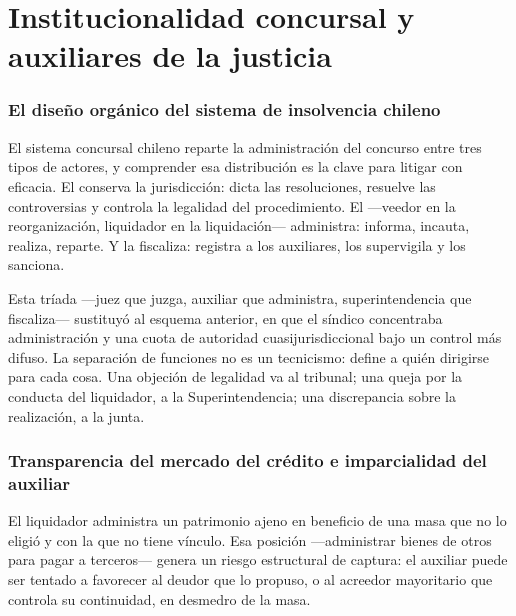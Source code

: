 \chapter{Institucionalidad concursal y auxiliares de la justicia}
\label{cap:institucionalidad}


\bloqueTeorico

\subsection{El diseño orgánico del sistema de insolvencia chileno}

El sistema concursal chileno reparte la administración del concurso entre tres tipos de
actores, y comprender esa distribución es la clave para litigar con eficacia. El
 conserva la jurisdicción: dicta las resoluciones, resuelve las
controversias y controla la legalidad del procedimiento. El  ---veedor en
la reorganización, liquidador en la liquidación--- administra: informa, incauta, realiza,
reparte. Y la \destacar{\Superir{}} fiscaliza: registra a los auxiliares, los supervigila y
los sanciona.

Esta tríada ---juez que juzga, auxiliar que administra, superintendencia que fiscaliza---
sustituyó al esquema anterior, en que el síndico concentraba administración y una cuota de
autoridad cuasijurisdiccional bajo un control más difuso. La separación de funciones no es
un tecnicismo: define a quién dirigirse para cada cosa. Una objeción de legalidad va al
tribunal; una queja por la conducta del liquidador, a la Superintendencia; una discrepancia
sobre la realización, a la junta.

\subsection{Transparencia del mercado del crédito e imparcialidad del auxiliar}

El liquidador administra un patrimonio ajeno en beneficio de una masa que no lo eligió y con
la que no tiene vínculo. Esa posición ---administrar bienes de otros para pagar a terceros---
genera un riesgo estructural de captura: el auxiliar puede ser tentado a favorecer al deudor
que lo propuso, o al acreedor mayoritario que controla su continuidad, en desmedro de la masa.

